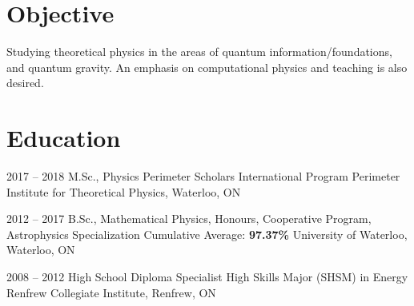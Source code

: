 \documentclass{article}
\begin{document}

    \section{Objective}
    Studying theoretical physics in the areas of quantum information/foundations, and quantum gravity. An emphasis on computational physics and teaching is also desired.
    \section{Education}
    \begin{educationlist}
        \item{2017 -- 2018}
             {M.Sc., Physics}
             {Perimeter Scholars International Program}
             {Perimeter Institute for Theoretical Physics, Waterloo, ON}
        \item{2012 -- 2017}
             {B.Sc., Mathematical Physics, Honours, Cooperative Program, Astrophysics Specialization}
             {Cumulative Average: \textbf{97.37\%}}
             {University of Waterloo, Waterloo, ON}
        \item{2008 -- 2012}
             {High School Diploma}
             {Specialist High Skills Major (SHSM) in Energy}
             {Renfrew Collegiate Institute, Renfrew, ON}
    \end{educationlist}
\end{document}
